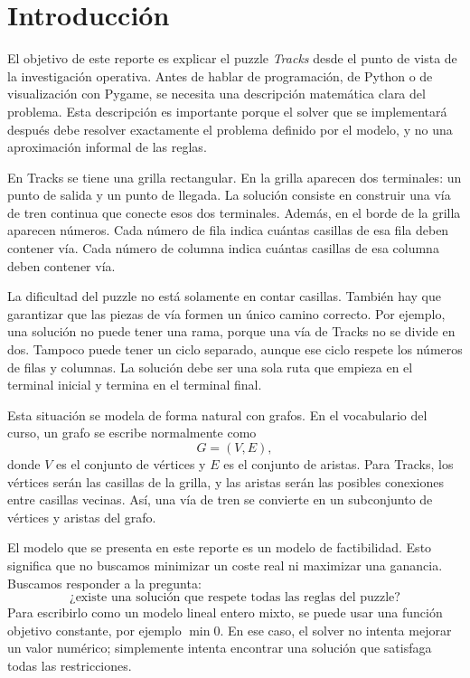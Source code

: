 \section{Introducción}

El objetivo de este reporte es explicar el puzzle \emph{Tracks} desde el punto de vista de la investigación operativa. Antes de hablar de programación, de Python o de visualización con Pygame, se necesita una descripción matemática clara del problema. Esta descripción es importante porque el solver que se implementará después debe resolver exactamente el problema definido por el modelo, y no una aproximación informal de las reglas.

En Tracks se tiene una grilla rectangular. En la grilla aparecen dos terminales: un punto de salida y un punto de llegada. La solución consiste en construir una vía de tren continua que conecte esos dos terminales. Además, en el borde de la grilla aparecen números. Cada número de fila indica cuántas casillas de esa fila deben contener vía. Cada número de columna indica cuántas casillas de esa columna deben contener vía.

La dificultad del puzzle no está solamente en contar casillas. También hay que garantizar que las piezas de vía formen un único camino correcto. Por ejemplo, una solución no puede tener una rama, porque una vía de Tracks no se divide en dos. Tampoco puede tener un ciclo separado, aunque ese ciclo respete los números de filas y columnas. La solución debe ser una sola ruta que empieza en el terminal inicial y termina en el terminal final.

Esta situación se modela de forma natural con grafos. En el vocabulario del curso, un grafo se escribe normalmente como
\[
    G = (V,E),
\]
donde \(V\) es el conjunto de vértices y \(E\) es el conjunto de aristas. Para Tracks, los vértices serán las casillas de la grilla, y las aristas serán las posibles conexiones entre casillas vecinas. Así, una vía de tren se convierte en un subconjunto de vértices y aristas del grafo.

El modelo que se presenta en este reporte es un modelo de factibilidad. Esto significa que no buscamos minimizar un coste real ni maximizar una ganancia. Buscamos responder a la pregunta:
\[
    \text{¿existe una solución que respete todas las reglas del puzzle?}
\]
Para escribirlo como un modelo lineal entero mixto, se puede usar una función objetivo constante, por ejemplo \(\min 0\). En ese caso, el solver no intenta mejorar un valor numérico; simplemente intenta encontrar una solución que satisfaga todas las restricciones.

